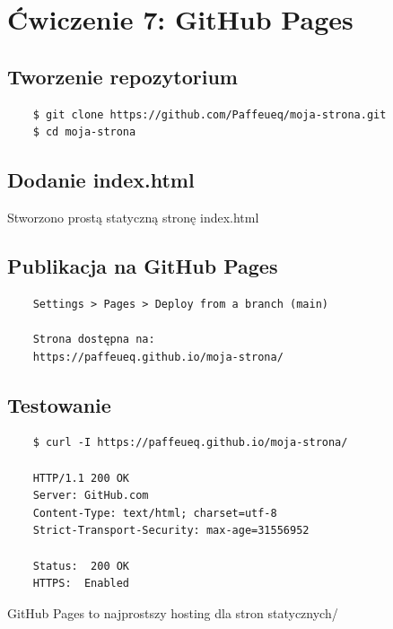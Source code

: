 \documentclass[twoside]{article}
\begin{document}
\section{Ćwiczenie 7: GitHub Pages}

\subsection{Tworzenie repozytorium}

\begin{verbatim}
	$ git clone https://github.com/Paffeueq/moja-strona.git
	$ cd moja-strona
\end{verbatim}

\subsection{Dodanie index.html}

Stworzono prostą statyczną stronę index.html

\subsection{Publikacja na GitHub Pages}

\begin{verbatim}
	Settings > Pages > Deploy from a branch (main)
	
	Strona dostępna na:
	https://paffeueq.github.io/moja-strona/
\end{verbatim}

\subsection{Testowanie}

\begin{verbatim}
	$ curl -I https://paffeueq.github.io/moja-strona/
	
	HTTP/1.1 200 OK
	Server: GitHub.com
	Content-Type: text/html; charset=utf-8
	Strict-Transport-Security: max-age=31556952
	
	Status:  200 OK
	HTTPS:  Enabled
\end{verbatim}

GitHub Pages to najprostszy hosting dla stron statycznych/
\end{document}
